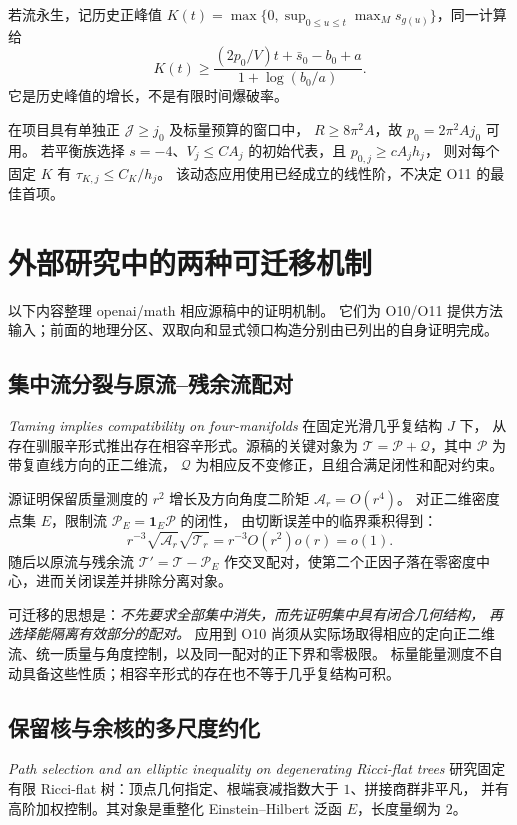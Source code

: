 \documentclass[UTF8,11pt,a4paper,fontset=none]{ctexart}
\numberwithin{equation}{section}
\theoremstyle{definition}
\theoremstyle{remark}\newtheorem{remark}[theorem]{说明}
\newcommand{\Jcal}{\mathcal J}
\begin{document}
若流永生，记历史正峰值
$K(t)=\max\{0,\sup_{0\le u\le t}\max_Ms_{g(u)}\}$，同一计算给
\begin{equation}\label{eq:flow-growth}
K(t)\ge\frac{(2p_0/V)t+\bar s_0-b_0+a}{1+\log(b_0/a)}.
\end{equation}
它是历史峰值的增长，不是有限时间爆破率。

在项目具有单独正 $\Jcal\ge j_0$ 及标量预算的窗口中，
$R\ge8\pi^2A$，故 $p_0=2\pi^2Aj_0$ 可用。
若平衡族选择 $s=-4$、$V_j\le CA_j$ 的初始代表，且 $p_{0,j}\ge cA_jh_j$，
则对每个固定 $K$ 有 $\tau_{K,j}\le C_K/h_j$。
该动态应用使用已经成立的线性阶，不决定 O11 的最佳首项。

\section{外部研究中的两种可迁移机制}\label{sec:external}

以下内容整理 openai/math 相应源稿中的证明机制\cite{OAI342,OAITree}。
它们为 O10/O11 提供方法输入；前面的地理分区、双取向和显式领口构造分别由已列出的自身证明完成。

\subsection{集中流分裂与原流--残余流配对}
\emph{Taming implies compatibility on four-manifolds} 在固定光滑几乎复结构 $J$ 下，
从存在驯服辛形式推出存在相容辛形式。源稿的关键对象为
$\mathscr T=\mathscr P+\mathscr Q$，其中 $\mathscr P$ 为带复直线方向的正二维流，
$\mathscr Q$ 为相应反不变修正，且组合满足闭性和配对约束。

源证明保留质量测度的 $r^2$ 增长及方向角度二阶矩
$\mathcal A_r=O(r^4)$。
对正二维密度点集 $E$，限制流 $\mathscr P_E=\mathbf1_E\mathscr P$ 的闭性，
由切断误差中的临界乘积得到：
\[
r^{-3}\sqrt{\mathcal A_r}\sqrt{\mathcal T_r}
=r^{-3}O(r^2)o(r)=o(1).
\]
随后以原流与残余流
$\mathscr T'=\mathscr T-\mathscr P_E$
作交叉配对，使第二个正因子落在零密度中心，进而关闭误差并排除分离对象。

可迁移的思想是：\emph{不先要求全部集中消失，而先证明集中具有闭合几何结构，
再选择能隔离有效部分的配对。}
应用到 O10 尚须从实际场取得相应的定向正二维流、统一质量与角度控制，以及同一配对的正下界和零极限。
标量能量测度不自动具备这些性质；相容辛形式的存在也不等于几乎复结构可积。

\subsection{保留核与余核的多尺度约化}
\emph{Path selection and an elliptic inequality on degenerating Ricci-flat trees}
研究固定有限 Ricci-flat 树：顶点几何指定、根端衰减指数大于 $1$、拼接商群非平凡，
并有高阶加权控制。其对象是重整化 Einstein--Hilbert 泛函 $E$，长度量纲为 $2$。
\end{document}
